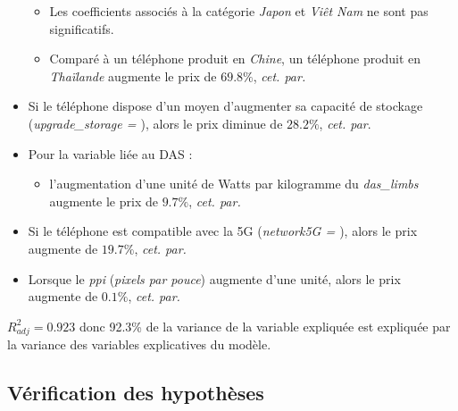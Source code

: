 \documentclass[
  12pt,
]{report}
\providecommand{\tightlist}{%
  \setlength{\itemsep}{0pt}\setlength{\parskip}{0pt}}\usepackage{longtable,booktabs,array}
\renewcommand{\texttt}[1]{\colorbox{light}{\color{highlight}{\ttfamily{#1}}}}
\begin{document}
\begin{itemize}
  \begin{itemize}
  \tightlist
  \item
    Les coefficients associés à la catégorie \emph{Japon} et \emph{Viêt
    Nam} ne sont pas significatifs.
  \item
    Comparé à un téléphone produit en \emph{Chine}, un téléphone produit
    en \emph{Thaïlande} augmente le prix de \(69.8\%\), \emph{cet. par.}
  \end{itemize}
\item
  Si le téléphone dispose d'un moyen d'augmenter sa capacité de stockage
  (\emph{upgrade\_storage = \texttt{TRUE}}), alors le prix diminue de
  \(28.2\%\), \emph{cet. par}.
\item
  Pour la variable liée au DAS :

  \begin{itemize}
  \tightlist
  \item
    l'augmentation d'une unité de Watts par kilogramme du
    \emph{das\_limbs} augmente le prix de \(9.7\%\), \emph{cet. par.}
  \end{itemize}
\item
  Si le téléphone est compatible avec la 5G (\emph{network5G =
  \texttt{TRUE}}), alors le prix augmente de \(19.7\%\), \emph{cet.
  par.}
\item
  Lorsque le \emph{ppi} (\emph{pixels par pouce}) augmente d'une unité,
  alors le prix augmente de \(0.1\%\), \emph{cet. par.}
\end{itemize}

\(R^2_{adj} = 0.923\) donc 92.3\% de la variance de la variable
expliquée est expliquée par la variance des variables explicatives du
modèle.

\newpage

\subsection{Vérification des
hypothèses}\label{vuxe9rification-des-hypothuxe8ses-1}
\end{document}
